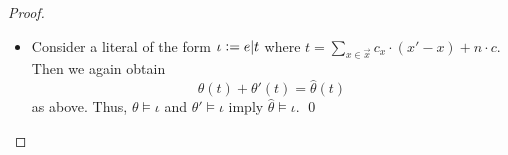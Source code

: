 {\begin{proof}
\begin{itemize}
\begin{align*}
              \theta(t) + \theta'(t) = {} & -\sum_{x \in \vec{x}} c_x \cdot \theta(x) + \theta(n) \cdot c + \sum_{x \in \vec{x}} c_x \cdot \theta'(x')+ \theta'(n) \cdot c \\
              {} = {}                     & \sum_{x \in \vec{x}} c_x \cdot \theta'(x') - \sum_{x \in \vec{x}} c_x \cdot \theta(x) + (\theta(n) + \theta'(n)) \cdot c       \\
              {} = {}                     & \sum_{x \in \vec{x}} c_x \cdot \hat{\theta}(x') - \sum_{x \in \vec{x}} c_x \cdot \hat{\theta}(x) + \hat{\theta}(n) \cdot c     \\
              {} = {}                     & \hat{\theta}(t)
            \end{align*}
            Therefore, $\theta \models \iota$ and $\theta' \models \iota$ implies $\hat{\theta} \models \iota$ for all ${\bowtie} \in \{\leq,\geq,<,>,=\}$.
      \item Consider a literal of the form $\iota \mathrel{\mathop:}= e|t$ where $t = \sum_{x \in \vec{x}} c_x \cdot (x'-x) + n \cdot c$.
            Then we again obtain
            \[
              \theta(t) + \theta'(t) = \hat{\theta}(t)
            \]
            as above.
            Thus, $\theta \models \iota$ and $\theta' \models \iota$ imply $\hat{\theta} \models \iota$.
            \qed
    \end{itemize}
  \end{proof}
}


